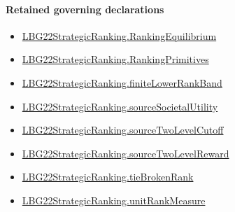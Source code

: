 \documentclass[10pt]{article}
\begin{document}
\paragraph{Retained governing declarations}
\begin{itemize}\raggedright
\item \hyperlink{paper-prerequisite-2a1b692f4e3136c6}{LBG22\allowbreak{}Strategic\allowbreak{}Ranking.\allowbreak{}Ranking\allowbreak{}Equilibrium}
\item \hyperlink{paper-prerequisite-9bbcc12f4a1736bf}{LBG22\allowbreak{}Strategic\allowbreak{}Ranking.\allowbreak{}Ranking\allowbreak{}Primitives}
\item \hyperlink{paper-prerequisite-a42f440ddc254fa7}{LBG22\allowbreak{}Strategic\allowbreak{}Ranking.\allowbreak{}finite\allowbreak{}Lower\allowbreak{}Rank\allowbreak{}Band}
\item \hyperlink{paper-prerequisite-7224ad4c7b0b8551}{LBG22\allowbreak{}Strategic\allowbreak{}Ranking.\allowbreak{}source\allowbreak{}Societal\allowbreak{}Utility}
\item \hyperlink{paper-prerequisite-f88aac58507e44ca}{LBG22\allowbreak{}Strategic\allowbreak{}Ranking.\allowbreak{}source\allowbreak{}Two\allowbreak{}Level\allowbreak{}Cutoff}
\item \hyperlink{paper-prerequisite-30d97cd43eb79017}{LBG22\allowbreak{}Strategic\allowbreak{}Ranking.\allowbreak{}source\allowbreak{}Two\allowbreak{}Level\allowbreak{}Reward}
\item \hyperlink{paper-prerequisite-b7c71e53177b76c6}{LBG22\allowbreak{}Strategic\allowbreak{}Ranking.\allowbreak{}tie\allowbreak{}Broken\allowbreak{}Rank}
\item \hyperlink{governing-declaration-678cf48d549cb620}{LBG22\allowbreak{}Strategic\allowbreak{}Ranking.\allowbreak{}unit\allowbreak{}Rank\allowbreak{}Measure}
\end{itemize}
\end{document}
